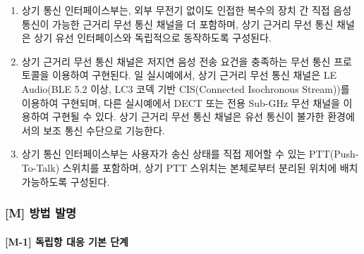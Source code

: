 \documentclass{article}
\begin{document}
\begin{enumerate}[label = \textbf{(D.2.\arabic*)}]

    \item 상기 통신 인터페이스부는, 외부 무전기 없이도
    인접한 복수의 장치 간 직접 음성 통신이 가능한 근거리
    무선 통신 채널을 더 포함하며, 상기 근거리 무선 통신
    채널은 상기 유선 인터페이스와 독립적으로 동작하도록
    구성된다.

    \item 상기 근거리 무선 통신 채널은 저지연 음성 전송
    요건을 충족하는 무선 통신 프로토콜을 이용하여 구현된다.
    일 실시예에서, 상기 근거리 무선 통신 채널은 LE Audio(BLE 5.2 이상, LC3 코덱 기반 CIS(Connected Isochronous Stream))를 이용하여 구현되며, 다른 실시예에서 DECT 또는 전용 Sub-GHz 무선 채널을 이용하여 구현될 수 있다. 상기 근거리 무선 통신 채널은 유선 통신이 불가한 환경에서의 보조 통신
    수단으로 기능한다.

    \item 상기 통신 인터페이스부는 사용자가 송신 상태를
    직접 제어할 수 있는 PTT(Push-To-Talk) 스위치를
    포함하며, 상기 PTT 스위치는 본체로부터 분리된
    위치에 배치 가능하도록 구성된다.

\end{enumerate}


\subsubsection{[M] 방법 발명}

\paragraph{[M-1] 독립항 대응 기본 단계}
\end{document}
